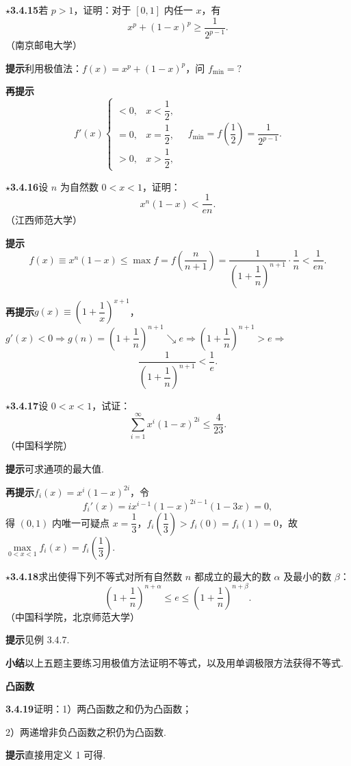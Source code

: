 \documentclass[UTF8,12pt,a4paper,fontset=fandol]{ctexart}
\begin{document}
\noindent\textbf{$\star$3.4.15}\quad 若 $p>1$，证明：对于 $[0,1]$ 内任一 $x$，有
\[
  x^p+(1-x)^p\ge\frac1{2^{p-1}}.
\]
（南京邮电大学）

\noindent\textbf{提示}\quad 利用极值法：$f(x)=x^p+(1-x)^p$，问 $f_{\min}=?$

\noindent\textbf{再提示}\quad
\[
f'(x)
\begin{cases}
<0, & x<\dfrac12,\\
=0, & x=\dfrac12,\\
>0, & x>\dfrac12,
\end{cases}
\quad
f_{\min}=f\left(\frac12\right)=\frac1{2^{p-1}}.
\]

\noindent\textbf{$\star$3.4.16}\quad 设 $n$ 为自然数 $0<x<1$，证明：
\[
  x^n(1-x)<\frac1{en}.
\]
（江西师范大学）

\noindent\textbf{提示}\quad
\[
  f(x)\equiv x^n(1-x)\le\max f=f\left(\frac n{n+1}\right)
  =\frac1{\left(1+\dfrac1n\right)^{n+1}}\cdot\frac1n<\frac1{en}.
\]

\noindent\textbf{再提示}\quad $g(x)\equiv\left(1+\dfrac1x\right)^{x+1}$，$g'(x)<0\Rightarrow g(n)=\left(1+\dfrac1n\right)^{n+1}\searrow e\Rightarrow\left(1+\dfrac1n\right)^{n+1}>e\Rightarrow$
\[
  \frac1{\left(1+\dfrac1n\right)^{n+1}}<\frac1e.
\]

\noindent\textbf{$\star$3.4.17}\quad 设 $0<x<1$，试证：
\[
  \sum_{i=1}^\infty x^i(1-x)^{2i}\le\frac4{23}.
\]
（中国科学院）

\noindent\textbf{提示}\quad 可求通项的最大值.

\noindent\textbf{再提示}\quad $f_i(x)=x^i(1-x)^{2i}$，令
\[
  f_i'(x)=ix^{i-1}(1-x)^{2i-1}(1-3x)=0,
\]
得 $(0,1)$ 内唯一可疑点 $x=\dfrac13$，$f_i\left(\dfrac13\right)>f_i(0)=f_i(1)=0$，故 $\max\limits_{0<x<1}f_i(x)=f_i\left(\dfrac13\right)$.

\noindent\textbf{$\star$3.4.18}\quad 求出使得下列不等式对所有自然数 $n$ 都成立的最大的数 $\alpha$ 及最小的数 $\beta$：
\[
  \left(1+\frac1n\right)^{n+\alpha}\le e\le
  \left(1+\frac1n\right)^{n+\beta}.
\]
（中国科学院，北京师范大学）

\noindent\textbf{提示}\quad 见例 3.4.7.

\noindent\textbf{小结}\quad 以上五题主要练习用极值方法证明不等式，以及用单调极限方法获得不等式.

\noindent\textbf{凸函数}

\noindent\textbf{3.4.19}\quad 证明：1）两凸函数之和仍为凸函数；

2）两递增非负凸函数之积仍为凸函数.

\noindent\textbf{提示}\quad 直接用定义 1 可得.
\end{document}
